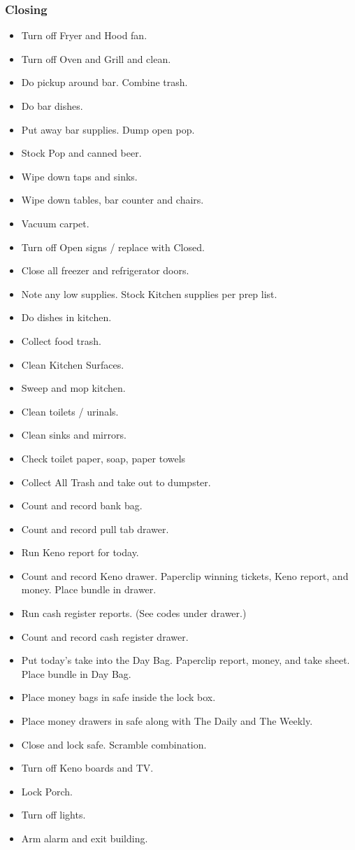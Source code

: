 \documentclass[11pt]{article}
\begin{document}
\subsubsection{Closing}
\label{sec-1-1-2}
\begin{itemize}
\item Turn off Fryer and Hood fan.
\item Turn off Oven and Grill and clean.
\item Do pickup around bar. Combine trash.
\item Do bar dishes.
\item Put away bar supplies. Dump open pop.
\item Stock Pop and canned beer.
\item Wipe down taps and sinks.
\item Wipe down tables, bar counter and chairs.
\item Vacuum carpet.
\item Turn off Open signs / replace with Closed.
\item Close all freezer and refrigerator doors.
\item Note any low supplies. Stock Kitchen supplies per prep list.
\item Do dishes in kitchen.
\item Collect food trash.
\item Clean Kitchen Surfaces.
\item Sweep and mop kitchen.
\item Clean toilets / urinals.
\item Clean sinks and mirrors.
\item Check toilet paper, soap, paper towels
\item Collect All Trash and take out to dumpster.
\item Count and record bank bag.
\item Count and record pull tab drawer.
\item Run Keno report for today.
\item Count and record Keno drawer. Paperclip winning tickets, Keno report, and money. Place bundle in drawer.
\item Run cash register reports. (See codes under drawer.)
\item Count and record cash register drawer.
\item Put today's take into the Day Bag. Paperclip report, money, and take sheet. Place bundle in Day Bag.
\item Place money bags in safe inside the lock box.
\item Place money drawers in safe along with The Daily and The Weekly.
\item Close and lock safe. Scramble combination.
\item Turn off Keno boards and TV.
\item Lock Porch.
\item Turn off lights.
\item Arm alarm and exit building.
\end{itemize}
\end{document}
